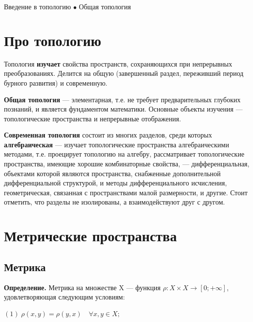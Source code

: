 \documentclass[12pt,a4paper]{article}
\begin{document}
{\large \hspace{4.5 cm} Введение в топологию $\bullet$ Общая топология}

\vspace{-1.5ex}

\hrulefill

\fontsize{14.4pt}{5.5mm}\selectfont

\vspace{-3ex}

\hrulefill

\tableofcontents
\newpage 

\section{Про топологию}

Топология \textbf{изучает} свойства пространств, сохраняющихся при непрерывных преобразованиях. Делится на общую (завершенный раздел, переживший период бурного развития) и современную. 

\textbf{Общая топология} --- элементарная, т.е. не требует предварительных глубоких познаний, и является фундаментом математики. Основные объекты изучения --- топологические пространства и непрерывные отображения. 

\textbf{Современная топология} состоит из многих разделов, среди которых \textbf{алгебраическая} --- изучает топологические пространства алгебраическими методами, т.е. проецирует топологию на алгебру, рассматривает топологические пространства, имеющие хорошие комбинаторные свойства, --- дифференциальная, объектами которой являются пространства, снабженные дополнительной дифференциальной структурой, и методы дифференциального исчисления, геометрическая, связанная с пространствами малой размерности, и другие. Стоит отметить, что разделы не изолированы, а взаимодействуют друг с другом. 

\section{Метрические пространства}

\subsection{Метрика}

\textbf{Определение.} Метрика на множестве X --- функция $\rho\!\!: X \times X \to [0; +\infty]$, удовлетворяющая следующим условиям:

$(1) \; \rho(x, y) = \rho(y, x) \quad \forall x, y \in X;$
\end{document}

